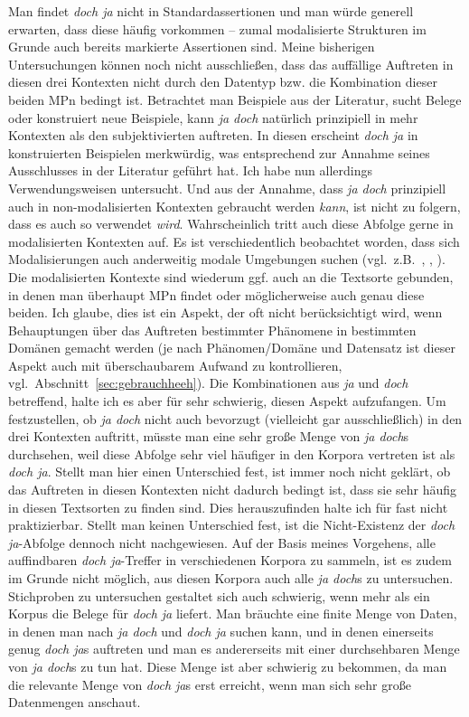 Man findet \textit{doch ja} nicht in Standardassertionen und man würde generell erwarten, dass diese häufig vorkommen – zumal modalisierte Strukturen im Grunde auch bereits markierte Assertionen sind. Meine bisherigen Untersuchungen können noch nicht ausschließen, dass das auffällige Auftreten in diesen drei Kontexten nicht durch den Datentyp bzw. die Kombination dieser beiden MPn bedingt ist. Betrachtet man Beispiele aus der Literatur, sucht Belege oder konstruiert neue Beispiele, kann \textit{ja doch} natürlich prinzipiell in mehr Kontexten als den subjektivierten auftreten. In diesen erscheint \textit{doch ja} in konstruierten Beispielen merkwürdig, was entsprechend zur Annahme seines Ausschlusses in der Lite\-ratur geführt hat. Ich habe nun allerdings Verwendungsweisen untersucht. Und aus der Annahme, dass \textit{ja doch} prinzipiell auch in non-modalisierten Kontexten gebraucht werden \emph{kann}, ist nicht zu folgern, dass es auch so verwendet \emph{wird}. Wahrscheinlich tritt auch diese Abfolge gerne in modalisierten Kontexten auf. Es ist verschiedentlich beobachtet worden, dass sich Modalisierungen auch anderweitig modale Umgebungen suchen (vgl.\ z.B.\ \citealt[26]{Albrecht1977}, \citealt[26]{Aijmer1997}, \citealt[278--279]{Bluehdorn2006}). Die modalisierten Kontexte sind wiederum ggf. auch an die Textsorte gebunden, in denen man überhaupt MPn findet oder möglicherweise auch genau diese beiden. Ich glaube, dies ist ein Aspekt, der oft nicht berücksichtigt wird, wenn Behauptungen über das Auftreten bestimmter Phänomene in bestimmten Domänen gemacht werden (je nach Phänomen/Domä\-ne und Datensatz ist dieser Aspekt auch mit überschaubarem Aufwand zu kontrollieren, vgl.\ Abschnitt~\ref{sec:gebrauchheeh}). Die Kombinationen aus \textit{ja} und \textit{doch} betreffend, halte ich es aber für sehr schwierig, diesen Aspekt aufzufangen. Um festzustellen, ob \textit{ja doch} nicht auch bevorzugt (vielleicht gar ausschließlich) in den drei Kontexten auftritt, müsste man eine sehr große Menge von \textit{ja doch}s durchsehen, weil diese Abfolge sehr viel häufiger in den Korpora vertreten ist als \textit{doch ja}. Stellt man hier einen Unterschied fest, ist immer noch nicht geklärt, ob das Auftreten in diesen Kontexten nicht dadurch bedingt ist, dass sie sehr häufig in diesen Textsorten zu finden sind. Dies herauszufinden halte ich für fast nicht praktizierbar. Stellt man keinen Unterschied fest, ist die Nicht-Existenz der \textit{doch ja}-Abfolge dennoch nicht nachgewiesen. Auf der Basis meines Vorgehens, alle auffindbaren \textit{doch ja}-Treffer in verschiedenen Korpora zu sammeln, ist es zudem im Grunde nicht möglich, aus diesen Korpora auch alle \textit{ja doch}s zu untersuchen. Stichproben zu untersuchen gestaltet sich auch schwierig, wenn mehr als ein Korpus die Belege für \textit{doch ja} liefert. Man bräuchte eine finite Menge von Daten, in denen man nach \textit{ja doch} und \textit{doch ja} suchen kann, und in denen ei\-nerseits genug \textit{doch ja}s auftreten und man es andererseits mit einer durchsehbaren Menge von \textit{ja doch}s zu tun hat. Diese Menge ist aber schwierig zu bekommen, da man die relevante Menge von \textit{doch ja}s erst erreicht, wenn man sich sehr große Datenmengen anschaut.

